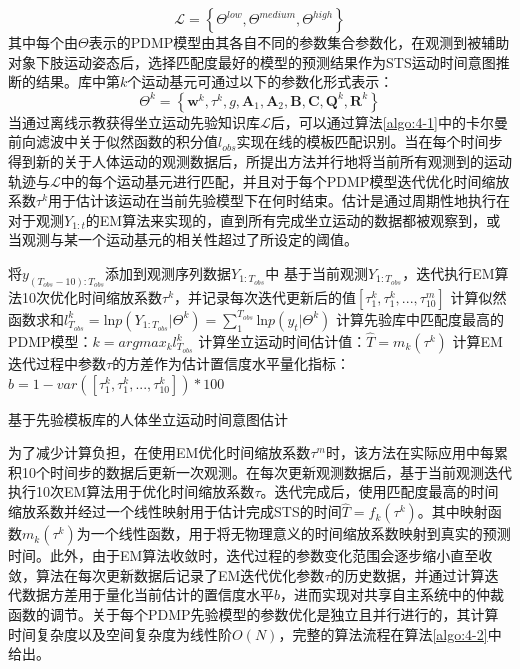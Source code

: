 \begin{equation}
    \mathscr{L}=\left\{\Theta^{low}, \Theta^{medium}, \Theta^{high}\right\}
    \label{eq:4-37}
\end{equation}
其中每个由$\Theta$表示的PDMP模型由其各自不同的参数集合参数化，在观测到被辅助对象下肢运动姿态后，选择匹配度最好的模型的预测结果作为STS运动时间意图推断的结果。库中第$k$个运动基元可通过以下的参数化形式表示：
\begin{equation}
    \Theta ^{k}=\left\{\pmb{w}^{k}, \tau^{k}, g, \mathbf{A}_1, \mathbf{A}_2, \mathbf{B}, \mathbf{C}, \mathbf{Q}^{k}, \mathbf{R}^{k}\right\}
    \label{eq:4-38}
\end{equation}
当通过离线示教获得坐立运动先验知识库$\mathscr{L}$后，可以通过算法\ref{algo:4-1}中的卡尔曼前向滤波中关于似然函数的积分值$l_{obs}$实现在线的模板匹配识别。当在每个时间步得到新的关于人体运动的观测数据后，所提出方法并行地将当前所有观测到的运动轨迹与$\mathscr{L}$中的每个运动基元进行匹配，并且对于每个PDMP模型迭代优化时间缩放系数$\tau^{k}$用于估计该运动在当前先验模型下在何时结束。估计是通过周期性地执行在对于观测$Y_{1:t}$的EM算法来实现的，直到所有完成坐立运动的数据都被观察到，或当观测与某一个运动基元的相关性超过了所设定的阈值。
\begin{algorithm}[htb]
    \SetAlgoLined
    {
        将$y_{{(T_{obs}-10)}:T_{obs}}$添加到观测序列数据$Y_{1:T_{obs}}$中 \;
        {
            基于当前观测$Y_{1:T_{obs}}$，迭代执行EM算法10次优化时间缩放系数$\tau^k$，并记录每次迭代更新后的值$[\tau^k_1,\tau^k_1,...,\tau^m_{10}]$\;
            计算似然函数求和$l_{T_{obs}}^k=\text{ln}p(Y_{1:T_{obs}}|\Theta ^{k})=\sum_{1}^{T_{obs}} \text{ln}p(y_t|\Theta ^{k})$ \;
        }
        计算先验库中匹配度最高的PDMP模型：$k=argmax_k l_{T_{obs}}^k$\;
        计算坐立运动时间估计值：$\hat T = m_k(\tau^k)$\;
        计算EM迭代过程中参数$\tau$的方差作为估计置信度水平量化指标：$b = 1 - var([\tau^k_1,\tau^k_1,...,\tau^k_{10}]) * 100$\;
    }
    \caption{基于先验模板库的人体坐立运动时间意图估计}
    \label{algo:4-2}
\end{algorithm}

为了减少计算负担，在使用EM优化时间缩放系数$\tau^{m}$时，该方法在实际应用中每累积10个时间步的数据后更新一次观测。在每次更新观测数据后，基于当前观测迭代执行10次EM算法用于优化时间缩放系数$\tau$。迭代完成后，使用匹配度最高的时间缩放系数并经过一个线性映射用于估计完成STS的时间$\hat T=f_k(\tau^k)$。其中映射函数$m_k(\tau^k)$为一个线性函数，用于将无物理意义的时间缩放系数映射到真实的预测时间。此外，由于EM算法收敛时，迭代过程的参数变化范围会逐步缩小直至收敛，算法在每次更新数据后记录了EM迭代优化参数$\tau$的历史数据，并通过计算迭代数据方差用于量化当前估计的置信度水平$b$，进而实现对共享自主系统中的仲裁函数的调节。关于每个PDMP先验模型的参数优化是独立且并行进行的，其计算时间复杂度以及空间复杂度为线性阶$O(N)$，完整的算法流程在算法\ref{algo:4-2}中给出。

